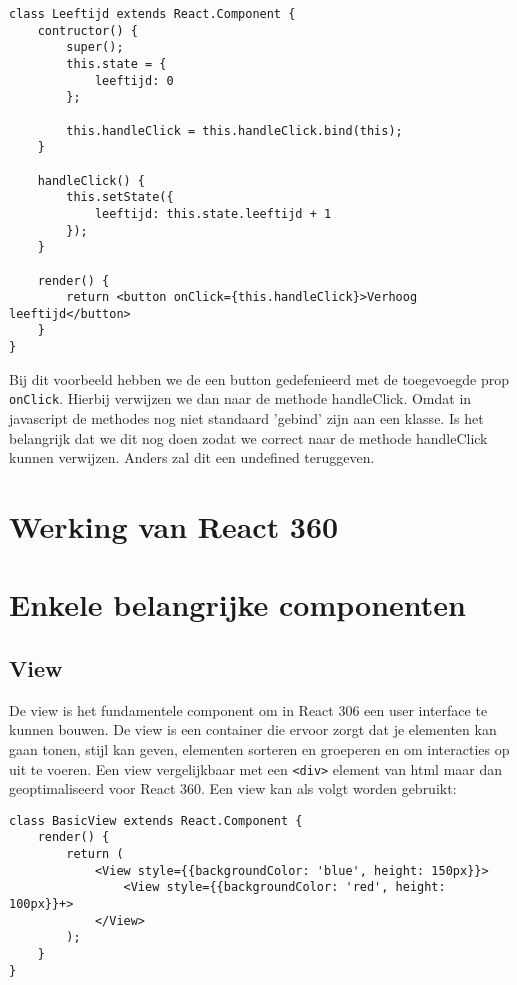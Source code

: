 \begin{lstlisting}[frame=single, caption=Voorbeeld van een vent afhandelen.]
class Leeftijd extends React.Component {
	contructor() {
		super();
		this.state = {
			leeftijd: 0
		};
		
		this.handleClick = this.handleClick.bind(this);
	}
	
	handleClick() {
		this.setState({
			leeftijd: this.state.leeftijd + 1
		});
	}

	render() {
		return <button onClick={this.handleClick}>Verhoog leeftijd</button>
	}
}
\end{lstlisting}

Bij dit voorbeeld hebben we de een button gedefenieerd met de toegevoegde prop \lstinline[basicstyle=\ttfamily\color{red}]|onClick|. Hierbij verwijzen we dan naar de methode handleClick. Omdat in javascript de methodes nog niet standaard 'gebind' zijn aan een klasse. Is het belangrijk dat we dit nog doen zodat we correct naar de methode handleClick kunnen verwijzen. Anders zal dit een undefined teruggeven.

\section{Werking van React 360}
\label{sec:werking-react360}
\autocite{Bieronski2016}

\section{Enkele belangrijke componenten}
\label{sec:reactvr-componenten}

\subsection{View}
\label{subsec:view}
De view is het fundamentele component om in React 306 een user interface te kunnen bouwen. De view is een container die ervoor zorgt dat je elementen kan gaan tonen, stijl kan geven, elementen sorteren en groeperen en om interacties op uit te voeren. Een view vergelijkbaar met een \lstinline[basicstyle=\ttfamily\color{red}]|<div>| element van html maar dan geoptimaliseerd voor React 360. Een view kan als volgt worden gebruikt:

\begin{lstlisting}[frame=single, caption=Een component die een View teruggeeft.]
class BasicView extends React.Component {
	render() {
		return (
			<View style={{backgroundColor: 'blue', height: 150px}}>
				<View style={{backgroundColor: 'red', height: 100px}}+>
			</View>
		);
	}
}
\end{lstlisting}

